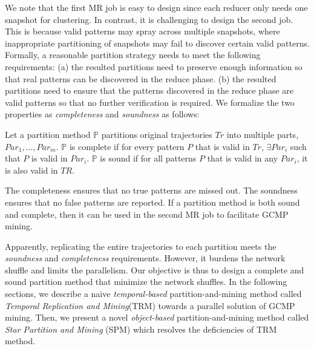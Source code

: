 We note that the first MR job is easy to design since each reducer only
needs one snapshot for clustering.
In contrast, it is challenging to design the second job. 
This is because valid patterns may spray across multiple snapshots, where inappropriate partitioning
of snapshots may fail to discover certain valid patterns.
Formally, a reasonable partition strategy 
needs to meet the following requirements: (a) the resulted partitions need
to preserve enough information so that real patterns can be discovered in the reduce phase. 
(b) the resulted partitions need to ensure that
the patterns discovered in the reduce phase are valid patterns so that
no further verification is required. We formalize the two 
properties as \emph{completeness} and \emph{soundness} as follows:

\begin{definition}
Let a partition method $\mathbb{P}$ partitions original trajectories $Tr$ into multiple parts, $Par_1,...,Par_m$. $\mathbb{P}$ is complete if for every pattern $P$ that is valid in $Tr$, $\exists Par_i$ such that $P$ is valid in $Par_i$. $\mathbb{P}$ is sound if for all patterns $P$ that is valid in any $Par_i$, it is also valid in $TR$.
\end{definition}
The completeness ensures that no true patterns are missed out. 
The soundness ensures that no false patterns are reported. 
If a partition method is both sound and complete, then it can be used
in the second MR job to facilitate GCMP mining.

Apparently, replicating the entire trajectories to each 
partition meets the \emph{soundness} and \emph{completeness} requirements. 
However, it burdens the network shuffle and limits the parallelism. 
Our objective is thus to design a complete and sound partition method that minimize the network shuffles.
In the following sections, we describe a naive \emph{temporal-based} partition-and-mining method called \emph{Temporal Replication and Mining}(TRM) towards a parallel solution of GCMP mining. Then,
we present a novel \emph{object-based} partition-and-mining method
called \emph{Star Partition and Mining} (SPM) which resolves
the deficiencies of TRM method.



%

